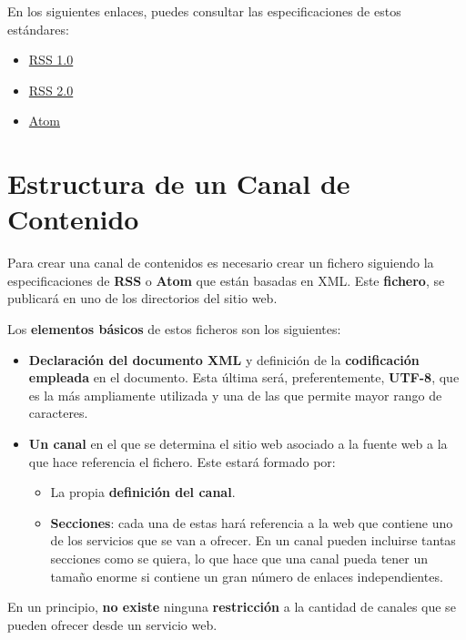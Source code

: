 En los siguientes enlaces, puedes consultar las especificaciones de estos estándares:

\begin{itemize}
    \item \href{http://web.resource.org/rss/1.0}{RSS 1.0}
    \item \href{https://cyber.harvard.edu/rss/rss.html}{RSS 2.0}
    \item \href{http://tools.ietf.org/html/rfc4287}{Atom}
\end{itemize}

\section{Estructura de un Canal de Contenido}
Para crear una canal de contenidos es necesario crear un fichero siguiendo la especificaciones de \textbf{RSS} o \textbf{Atom} que están basadas en XML. Este \textbf{fichero}, se publicará en uno de los directorios del sitio web.

Los \textbf{elementos básicos} de estos ficheros son los siguientes:

\begin{itemize}
    \item \textbf{Declaración del documento XML} y definición de la \textbf{codificación empleada} en el documento. Esta última será, preferentemente, \textbf{UTF-8}, que es la más ampliamente utilizada y una de las que permite mayor rango de caracteres.

    \item \textbf{Un canal} en el que se determina el sitio web asociado a la fuente web a la que hace referencia el fichero. Este estará formado por:

    \begin{itemize}
        \item La propia \textbf{definición del canal}.
        \item \textbf{Secciones}: cada una de estas hará referencia a la web que contiene uno de los servicios que se van a ofrecer. En un canal pueden incluirse tantas secciones como se quiera, lo que hace que una canal pueda tener un tamaño enorme si contiene un gran número de enlaces independientes.
    \end{itemize}
\end{itemize}

En un principio, \textbf{no existe} ninguna \textbf{restricción} a la cantidad de canales que se pueden ofrecer desde un servicio web.

